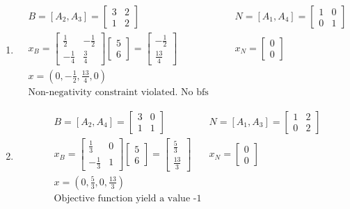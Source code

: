 \documentclass[11pt]{article}
\begin{document}
\begin{enumerate}
    \item \begin{align*}
        & B = [A_2, A_3]=\begin{bmatrix} 3 & 2 \\ 1 & 2\end{bmatrix} & N = [A_1, A_4]= \begin{bmatrix} 1 & 0 \\ 0 & 1\end{bmatrix}\\
        & x_B = \begin{bmatrix} \frac{1}{2} & -\frac{1}{2} \\ -\frac{1}{4} & \frac{3}{4}\end{bmatrix} \begin{bmatrix} 5 \\ 6 \end{bmatrix} = \begin{bmatrix}  -\frac{1}{2}\\ \frac{13}{4} \end{bmatrix} & x_N = \begin{bmatrix} 0 \\ 0\end{bmatrix} \\
        & x = (0, -\frac{1}{2}, \frac{13}{4}, 0) &\\
        & \text{Non-negativity constraint violated. No bfs generated.} &
    \end{align*}
    
    \item \begin{align*}
        & B = [A_2, A_4]=\begin{bmatrix} 3 & 0 \\ 1 & 1\end{bmatrix} & N = [A_1, A_3]=\begin{bmatrix} 1 & 2 \\ 0 & 2\end{bmatrix}\\
        & x_B = \begin{bmatrix} \frac{1}{3} &  0 \\ -\frac{1}{3} & 1 \end{bmatrix} \begin{bmatrix} 5 \\ 6 \end{bmatrix} = \begin{bmatrix}  \frac{5}{3} \\ \frac{13}{3} \end{bmatrix} & x_N = \begin{bmatrix} 0 \\ 0\end{bmatrix} \\
        & x = (0, \frac{5}{3}, 0,\frac{13}{3}) &\\
        & \text{Objective function yield a value -1} &
    \end{align*}
    

\end{enumerate}
\end{document}
